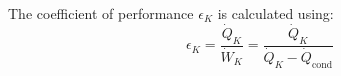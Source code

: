 The coefficient of performance \( \epsilon_K \) is calculated using:  
\[
\epsilon_K = \frac{\dot{Q}_K}{\dot{W}_K} = \frac{\dot{Q}_K}{\dot{Q}_K - \dot{Q}_{\text{cond}}}
\]
